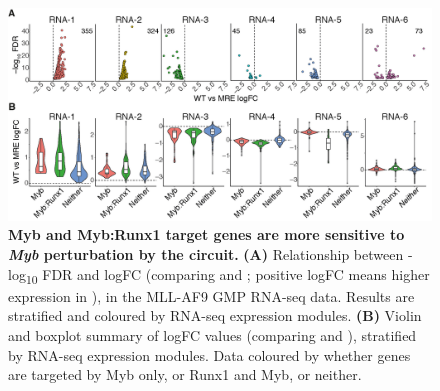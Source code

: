 \begin{figure}[!t]
    \centering
    \includegraphics[width=\textwidth,height=\textheight,keepaspectratio]{figures/chapter5/ch5_myb-runx1-wt-mre.png}
    \caption[{Myb and Myb:Runx1 target genes are more sensitive to \textit{Myb} perturbation by the \mybmre{} circuit.}]
    {\textbf{Myb and Myb:Runx1 target genes are more sensitive to \textit{Myb} perturbation by the \mybmre{} circuit.}
    \textbf{(A)} Relationship between -log\textsubscript{10} FDR and logFC (comparing \mybwt{} and \mybmre{}; positive logFC means higher expression in \mybmre{}), in the MLL-AF9 GMP RNA-seq data. Results are stratified and coloured by RNA-seq expression modules. 
    \textbf{(B)} Violin and boxplot summary of logFC values (comparing \mybwt{} and \mybmre{}), stratified by RNA-seq expression modules. Data coloured by whether genes are targeted by Myb only, or Runx1 and Myb, or neither. 
    }
    \label{fig:ch5_myb-runx1-wt-mre}
\end{figure}

